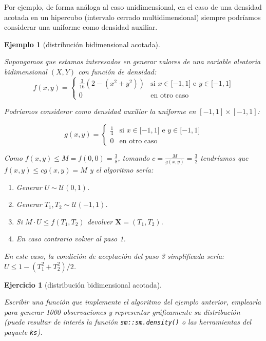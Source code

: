 \documentclass[
]{book}
\theoremstyle{break}
\newtheorem{exercise}{Ejercicio}[chapter]
\newtheorem{example}{Ejemplo}[chapter]
\theoremstyle{nonumberplain}
\begin{document}
Por ejemplo, de forma análoga al caso unidimensional, en el caso de una densidad
acotada en un hipercubo (intervalo cerrado multidimensional) siempre podríamos considerar
una uniforme como densidad auxiliar.

\begin{example}[distribución bidimensional acotada]
\protect\hypertarget{exm:ar-bidim}{}\label{exm:ar-bidim}

Supongamos que estamos interesados en generar valores de una variable aleatoria bidimensional
\(\left( X,Y\right)\) con función de densidad:
\[f(x,y)=\left\{ 
\begin{array}{cl}
\frac{3}{16}\left( 2-\left( x^2+y^2\right) \right)  & \text{si }x\in
\lbrack -1,1]\text{ e }y\in \lbrack -1,1] \\ 
0 & \text{en otro caso}
\end{array}
\right.\]

Podríamos considerar como densidad auxiliar la uniforme en \(\left[ -1,1\right] \times\left[ -1,1\right]\):

\[g\left( x, y \right)  =\left\{
\begin{array}{ll}
\frac{1}{4} & \text{si }x\in \lbrack -1,1]\text{ e }y\in \lbrack -1,1] \\
0 &  \text{en otro caso}
\end{array}\right.\]

Como \(f(x, y) \leq M = f(0,0) = \frac38\), tomando \(c=\frac{M}{g(x,y)} = \frac32\)
tendríamos que \(f(x,y) \leq cg(x,y) = M\) y el algoritmo sería:

\begin{enumerate}
\def\labelenumi{\arabic{enumi}.}
\item
  Generar \(U \sim \mathcal{U}\left( 0, 1\right)\).
\item
  Generar \(T_1, T_2 \sim \mathcal{U}\left( -1, 1 \right)\).
\item
  Si \(M \cdot U\leq f\left( T_1, T_2 \right)\)
  devolver \(\mathbf{X} = \left( T_1, T_2 \right)\).
\item
  En caso contrario volver al paso 1.
\end{enumerate}

En este caso, la condición de aceptación del paso 3 simplificada sería:
\(U \leq 1 - \left( T_1^2 + T_2^2 \right) / 2\).
\end{example}

\begin{exercise}[distribución bidimensional acotada]
\protect\hypertarget{exr:ar-bidim-r}{}\label{exr:ar-bidim-r}

Escribir una función que implemente el algoritmo del ejemplo anterior, emplearla para generar 1000 observaciones y representar gráficamente su distribución (puede resultar de interés la función \texttt{sm::sm.density()} o las herramientas del paquete \texttt{ks}).
\end{exercise}
\end{document}
